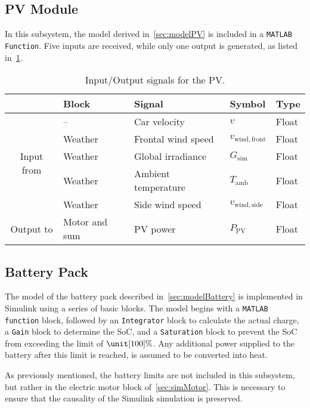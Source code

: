 \subsection{PV Module}
\label{sec:simPV}
In this subsystem, the model derived in~\cref{sec:modelPV} is included in a \texttt{MATLAB Function}. Five inputs are received, while only one output is generated, as listed in~\cref{tab:simInOutPV}.
\begin{table}[htbp]
	\centering
	\caption{Input/Output signals for the PV.}
	\label{tab:simInOutPV}
	
	\begin{tabular}{c l l l l}
		\toprule
		& Block & Signal & Symbol & Type \\ 
		\midrule
		\multirow{5}{*}{Input from}
		& -- & Car velocity & $v$ & Float \\
		& Weather & Frontal wind speed & $v_\mathrm{wind,front}$ & Float \\
		& Weather & Global irradiance & $G_\mathrm{sim}$ & Float \\
		& Weather & Ambient temperature & $T_\mathrm{amb}$ & Float \\
		& Weather & Side wind speed & $v_\mathrm{wind,side}$ & Float \\
		\midrule
		\multirow{1}{*}{Output to}
		& Motor and sum & PV power & $P_\mathrm{PV}$ & Float \\
		\bottomrule
	\end{tabular}
\end{table}

\subsection{Battery Pack}
\label{sec:simBattery}
The model of the battery pack described in~\cref{sec:modelBattery} is implemented in Simulink using a series of basic blocks. The model begins with a \texttt{MATLAB function} block, followed by an \texttt{Integrator} block to calculate the actual charge, a \texttt{Gain} block to determine the SoC, and a \texttt{Saturation} block to prevent the SoC from exceeding the limit of $\unit[100]{\%}$. Any additional power supplied to the battery after this limit is reached, is assumed to be converted into heat.

As previously mentioned, the battery limits are not included in this subsystem, but rather in the electric motor block of~\cref{sec:simMotor}. This is necessary to ensure that the causality of the Simulink simulation is preserved.

